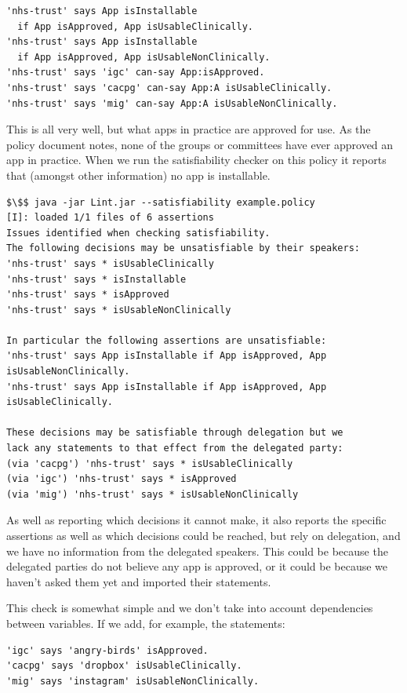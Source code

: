 \documentclass[a4paper]{scrartcl}
\begin{document}
\begin{lstlisting}
'nhs-trust' says App isInstallable
  if App isApproved, App isUsableClinically.
'nhs-trust' says App isInstallable
  if App isApproved, App isUsableNonClinically.
'nhs-trust' says 'igc' can-say App:isApproved.
'nhs-trust' says 'cacpg' can-say App:A isUsableClinically.
'nhs-trust' says 'mig' can-say App:A isUsableNonClinically.
\end{lstlisting}

This is all very well, but what apps in practice are approved for use.
As the policy document notes, none of the groups or committees have ever
approved an app in practice.  When we run the satisfiability checker on this policy
it reports that (amongst other information) no app is installable.

\begin{lstlisting}
$\$$ java -jar Lint.jar --satisfiability example.policy
[I]: loaded 1/1 files of 6 assertions
Issues identified when checking satisfiability.
The following decisions may be unsatisfiable by their speakers:
'nhs-trust' says * isUsableClinically
'nhs-trust' says * isInstallable
'nhs-trust' says * isApproved
'nhs-trust' says * isUsableNonClinically

In particular the following assertions are unsatisfiable:
'nhs-trust' says App isInstallable if App isApproved, App isUsableNonClinically.
'nhs-trust' says App isInstallable if App isApproved, App isUsableClinically.

These decisions may be satisfiable through delegation but we
lack any statements to that effect from the delegated party:
(via 'cacpg') 'nhs-trust' says * isUsableClinically
(via 'igc') 'nhs-trust' says * isApproved
(via 'mig') 'nhs-trust' says * isUsableNonClinically
\end{lstlisting}

As well as reporting which decisions it cannot make, it also reports the
specific assertions as well as which decisions could be reached, but rely on
delegation, and we have no information from the delegated speakers.  This could
be because the delegated parties do not believe any app is approved, or it could
be because we haven't asked them yet and imported their statements.

This check is somewhat simple and we don't take into account dependencies
between variables.  If we add, for example, the statements:

\begin{lstlisting}
'igc' says 'angry-birds' isApproved.
'cacpg' says 'dropbox' isUsableClinically.
'mig' says 'instagram' isUsableNonClinically.
\end{lstlisting}
\end{document}
